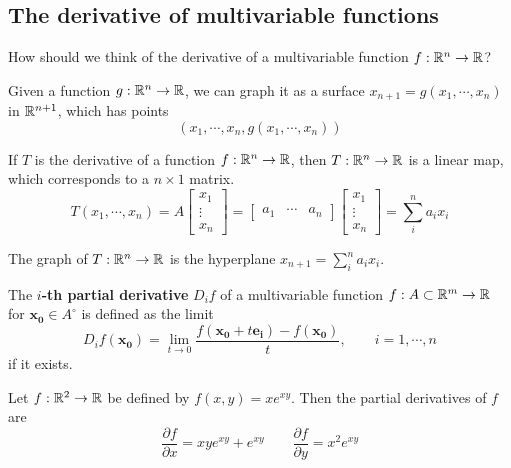 \subsection{The derivative of multivariable functions}

\begin{motivating}
    How should we think of the derivative of a multivariable function $f: \mathbb{R}^n \to \mathbb{R}$?
    \end{motivating}

Given a function $g: \mathbb{R}^n \to \mathbb{R}$, we can graph it as a surface $x_{n+1} = g(x_1, \cdots, x_n)$ in $\mathbb{R}^{n+1}$, which has points $$(x_1,\cdots, x_n, g(x_1, \cdots, x_n))$$
    
    
    If $T$ is the derivative of a function $f: \mathbb{R}^n \to \mathbb{R}$, then $T : \mathbb{R}^n \to \mathbb{R}$ is a linear map, which corresponds to a $n \times 1$ matrix.
    \begin{equation*}
T(x_1, \cdots, x_n) = A\begin{bmatrix}
x_1 \\
\vdots\\
x_n
\end{bmatrix}
=
\begin{bmatrix}
a_1 & \cdots & a_n
\end{bmatrix}\begin{bmatrix}
x_1 \\
\vdots\\
x_n
\end{bmatrix}
= \sum_i^n a_ix_i
\end{equation*}

\begin{proposition}
The graph of $T : \mathbb{R}^n \to \mathbb{R}$ is the hyperplane $x_{n+1} = \sum_i^n a_ix_i$.
\end{proposition}

\begin{definition}
    The \textbf{$i$-th partial derivative} $D_if$ of a multivariable function $f : A \subset \mathbb{R}^m \to \mathbb{R}$ for $\bm{x_0} \in A^\circ$ is defined as the limit
    $$D_if(\bm{x_0}) =  \lim_{t \to 0} \frac{f(\bm{x_0}+t\bm{e_i})-f(\bm{x_0})}{t}, \qquad i = 1, \cdots, n$$
    if it exists.
    
    \end{definition}

    \begin{example}
        Let $f: \mathbb{R}^2 \to \mathbb{R}$ be defined by $f(x,y) = xe^{xy}$.  Then the partial derivatives of $f$ are
        $$\frac{\partial f}{\partial x} = xye^{xy} + e^{xy} \qquad \frac{\partial f}{\partial y} = x^2e^{xy}$$
    \end{example}
    

